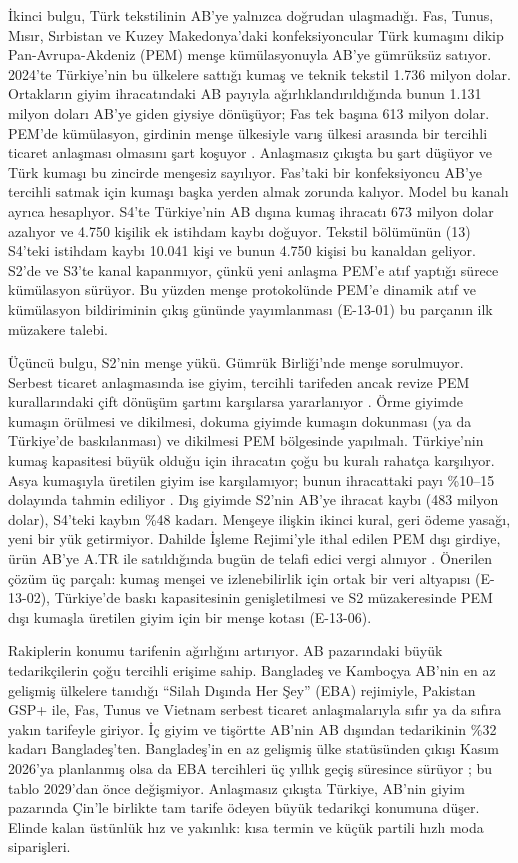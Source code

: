 İkinci bulgu, Türk tekstilinin AB'ye yalnızca doğrudan ulaşmadığı. Fas, Tunus, Mısır, Sırbistan ve Kuzey Makedonya'daki konfeksiyoncular Türk kumaşını dikip Pan-Avrupa-Akdeniz (PEM) menşe kümülasyonuyla AB'ye gümrüksüz satıyor. 2024'te Türkiye'nin bu ülkelere sattığı kumaş ve teknik tekstil 1.736 milyon dolar. Ortakların giyim ihracatındaki AB payıyla ağırlıklandırıldığında bunun 1.131 milyon doları AB'ye giden giysiye dönüşüyor; Fas tek başına 613 milyon dolar. PEM'de kümülasyon, girdinin menşe ülkesiyle varış ülkesi arasında bir tercihli ticaret anlaşması olmasını şart koşuyor \etiketV{}. Anlaşmasız çıkışta bu şart düşüyor ve Türk kumaşı bu zincirde menşesiz sayılıyor. Fas'taki bir konfeksiyoncu AB'ye tercihli satmak için kumaşı başka yerden almak zorunda kalıyor. Model bu kanalı ayrıca hesaplıyor. S4'te Türkiye'nin AB dışına kumaş ihracatı 673 milyon dolar azalıyor ve 4.750 kişilik ek istihdam kaybı doğuyor. Tekstil bölümünün (13) S4'teki istihdam kaybı 10.041 kişi ve bunun 4.750 kişisi bu kanaldan geliyor. S2'de ve S3'te kanal kapanmıyor, çünkü yeni anlaşma PEM'e atıf yaptığı sürece kümülasyon sürüyor. Bu yüzden menşe protokolünde PEM'e dinamik atıf ve kümülasyon bildiriminin çıkış gününde yayımlanması (E-13-01) bu parçanın ilk müzakere talebi.

Üçüncü bulgu, S2'nin menşe yükü. Gümrük Birliği'nde menşe sorulmuyor. Serbest ticaret anlaşmasında ise giyim, tercihli tarifeden ancak revize PEM kurallarındaki çift dönüşüm şartını karşılarsa yararlanıyor \etiketV{}. Örme giyimde kumaşın örülmesi ve dikilmesi, dokuma giyimde kumaşın dokunması (ya da Türkiye'de baskılanması) ve dikilmesi PEM bölgesinde yapılmalı. Türkiye'nin kumaş kapasitesi büyük olduğu için ihracatın çoğu bu kuralı rahatça karşılıyor. Asya kumaşıyla üretilen giyim ise karşılamıyor; bunun ihracattaki payı \%10--15 dolayında tahmin ediliyor \etiketH{}. Dış giyimde S2'nin AB'ye ihracat kaybı (483 milyon dolar), S4'teki kaybın \%48 kadarı. Menşeye ilişkin ikinci kural, geri ödeme yasağı, yeni bir yük getirmiyor. Dahilde İşleme Rejimi'yle ithal edilen PEM dışı girdiye, ürün AB'ye A.TR ile satıldığında bugün de telafi edici vergi alınıyor \etiketV{}. Önerilen çözüm üç parçalı: kumaş menşei ve izlenebilirlik için ortak bir veri altyapısı (E-13-02), Türkiye'de baskı kapasitesinin genişletilmesi ve S2 müzakeresinde PEM dışı kumaşla üretilen giyim için bir menşe kotası (E-13-06).

Rakiplerin konumu tarifenin ağırlığını artırıyor. AB pazarındaki büyük tedarikçilerin çoğu tercihli erişime sahip. Bangladeş ve Kamboçya AB'nin en az gelişmiş ülkelere tanıdığı ``Silah Dışında Her Şey'' (EBA) rejimiyle, Pakistan GSP+ ile, Fas, Tunus ve Vietnam serbest ticaret anlaşmalarıyla sıfır ya da sıfıra yakın tarifeyle giriyor. İç giyim ve tişörtte AB'nin AB dışından tedarikinin \%32 kadarı Bangladeş'ten. Bangladeş'in en az gelişmiş ülke statüsünden çıkışı Kasım 2026'ya planlanmış olsa da EBA tercihleri üç yıllık geçiş süresince sürüyor \etiketV{}; bu tablo 2029'dan önce değişmiyor. Anlaşmasız çıkışta Türkiye, AB'nin giyim pazarında Çin'le birlikte tam tarife ödeyen büyük tedarikçi konumuna düşer. Elinde kalan üstünlük hız ve yakınlık: kısa termin ve küçük partili hızlı moda siparişleri.

